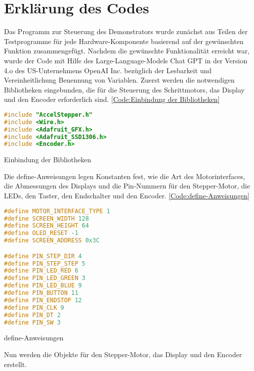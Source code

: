 \section{Erklärung des Codes}

Das Programm zur Steuerung des Demonstrators wurde zunächst aus Teilen der Testprogramme für jede Hardware-Komponente basierend auf der gewünschten Funktion zusammengefügt. Nachdem die gewünschte Funktionalität erreicht war, wurde der Code mit Hilfe des Large-Language-Models Chat GPT in der Version 4.o des US-Unternehmens OpenAI Inc. bezüglich der Lesbarkeit und Vereinheitlichung Benennung von Variablen.
Zuerst werden die notwendigen Bibliotheken eingebunden, die für die Steuerung des Schrittmotors, das Display und den Encoder erforderlich sind. \ref{Code:Einbindung der Bibliotheken}

\begin{code}
	\begin{lstlisting}[language=c++]
#include "AccelStepper.h"
#include <Wire.h>
#include <Adafruit_GFX.h>
#include <Adafruit_SSD1306.h>
#include <Encoder.h>
\end{lstlisting}      

\caption[Einbindung der Bibliotheken]{Einbindung der Bibliotheken}\label{Code:Einbindung der Bibliotheken}    
\end{code} 

Die define-Anweisungen legen Konstanten fest, wie die Art des Motorinterfaces, die Abmessungen des Displays und die Pin-Nummern für den Stepper-Motor, die LEDs, den Taster, den Endschalter und den Encoder. \ref{Code:define-Anweisungen}

\begin{code}
	\begin{lstlisting}[language=c++]
#define MOTOR_INTERFACE_TYPE 1
#define SCREEN_WIDTH 128
#define SCREEN_HEIGHT 64
#define OLED_RESET -1
#define SCREEN_ADDRESS 0x3C

#define PIN_STEP_DIR 4
#define PIN_STEP_STEP 5
#define PIN_LED_RED 6
#define PIN_LED_GREEN 3
#define PIN_LED_BLUE 9
#define PIN_BUTTON 11
#define PIN_ENDSTOP 12
#define PIN_CLK 9
#define PIN_DT 2
#define PIN_SW 3
\end{lstlisting}      

\caption[define-Anweisungen]{define-Anweisungen}\label{Code:define-Anweisungen}    
\end{code} 

Nun werden die Objekte für den Stepper-Motor, das Display und den Encoder erstellt.

